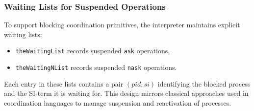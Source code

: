 \subsubsection{Waiting Lists for Suspended Operations}
To support blocking coordination primitives, the interpreter maintains explicit waiting lists:

\begin{itemize}
    \item \texttt{theWaitingList} records suspended \texttt{ask} operations,
    \item \texttt{theWaitingNList} records suspended \texttt{nask} operations.
\end{itemize}

Each entry in these lists contains a pair $(pid, si)$ identifying the blocked process and the
SI-term it is waiting for. This design mirrors classical approaches used in coordination
languages to manage suspension and reactivation of processes.





\newpage